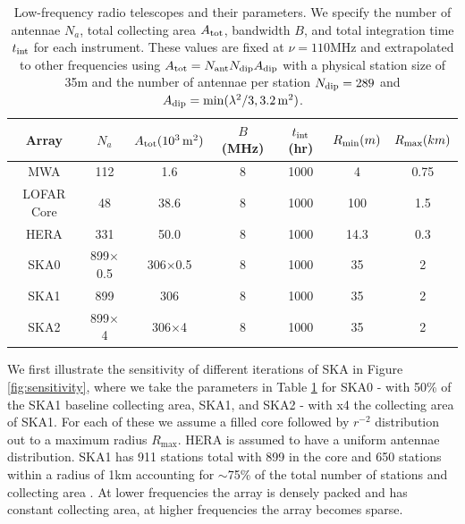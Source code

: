 \documentclass{PoS}
\begin{document}
\begin{table}[htdp]
\caption{Low-frequency radio telescopes and their parameters.  We specify the number of antennae $N_a$, total collecting area $A_{\rm tot}$, bandwidth $B$, and total integration time $t_{\rm int}$ for each instrument. These values are fixed at $\nu=110$MHz and extrapolated to other frequencies using $A_{\rm tot}=N_{\rm ant}N_{\rm dip}A_{\rm dip}$ with a physical station size of 35m and the number of antennae per station $N_{\rm dip}=289$ and $A_{\rm dip}=\min(\lambda^2/3,3.2\,{ \rm m^2})$.}
\begin{center}
\begin{tabular}{ccccccc}
\hline
\hline
Array & $N_a$ & $A_{\rm tot}(10^3\,{\rm m^2})$ & $B$ (MHz) & $t_{\rm int}$ (hr)& $R_{\rm min} (m)$ & $R_{\rm max} (km)$\\
\hline
MWA & 112 & 1.6  & 8 & 1000 & 4 & 0.75\\
LOFAR Core & 48 & 38.6  & 8 & 1000 & 100 & 1.5\\
HERA & 331 & 50.0  & 8 & 1000 & 14.3 & 0.3\\
SKA0 & 899$\times$0.5 & 306$\times$0.5  & 8 & 1000 & 35 & 2\\
SKA1 & 899 & 306  & 8 & 1000 & 35 & 2\\
SKA2 & 899$\times$4 & 306$\times$4 & 8 & 1000 & 35 & 2\\
\hline
\hline
\end{tabular}
\end{center}
\label{tab:telescopes}
\end{table}%

We first illustrate the sensitivity of different iterations of SKA in Figure \ref{fig:sensitivity}, where we take the parameters in Table \ref{tab:telescopes} for SKA0 - with 50\% of the SKA1 baseline collecting area, SKA1, and SKA2 - with x4 the collecting area of SKA1. For each of these we assume a filled core followed by $r^{-2}$ distribution out to a maximum radius $R_{\max}$. HERA is assumed to have a uniform antennae distribution. SKA1 has 911 stations total with 899 in the core and 650 stations within a radius of 1km accounting for $\sim$75\% of the total number of stations and collecting area \citep{Dewdney:2013}. At lower frequencies the array is densely packed and has constant collecting area, at higher frequencies the array becomes sparse.
\end{document}
